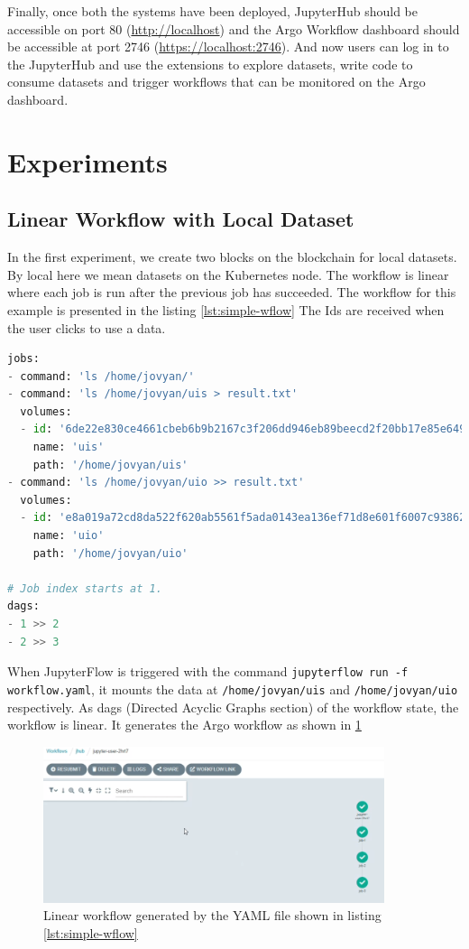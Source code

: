 \bigskip
Finally, once both the systems have been deployed, JupyterHub should be accessible on port 80 (\url{http://localhost}) and the Argo Workflow dashboard should be accessible at port 2746 (\url{https://localhost:2746}). And now users can log in to the JupyterHub and use the extensions to explore datasets, write code to consume datasets and trigger workflows that can be monitored on the Argo dashboard.

\section{Experiments}
\subsection{Linear Workflow with Local Dataset}
In the first experiment, we create two blocks on the blockchain for local datasets. By local here we mean datasets on the Kubernetes node. The workflow is linear where each job is run after the previous job has succeeded. The workflow for this example is presented in the listing \ref{lst:simple-wflow} The Ids are received when the user clicks to use a data.

\begin{lstlisting}[language=python,caption={Simple linear workflow.yaml consuming data from the Kubernetes node},label={lst:simple-wflow}]
jobs:
- command: 'ls /home/jovyan/'
- command: 'ls /home/jovyan/uis > result.txt'
  volumes:
  - id: '6de22e830ce4661cbeb6b9b2167c3f206dd946eb89beecd2f20bb17e85e64995'
    name: 'uis'
    path: '/home/jovyan/uis'
- command: 'ls /home/jovyan/uio >> result.txt'
  volumes:
  - id: 'e8a019a72cd8da522f620ab5561f5ada0143ea136ef71d8e601f6007c9386269'
    name: 'uio'
    path: '/home/jovyan/uio'

# Job index starts at 1.
dags:
- 1 >> 2
- 2 >> 3
\end{lstlisting}

When JupyterFlow is triggered with the command \lstinline{jupyterflow run -f workflow.yaml}, it mounts the data at \lstinline{/home/jovyan/uis} and \lstinline{/home/jovyan/uio} respectively. As dags (Directed Acyclic Graphs section) of the workflow state, the workflow is linear. It generates the Argo workflow as shown in \ref{fig:linear-wflow}

\begin{figure}
    \centering
    \includegraphics[width=10cm,keepaspectratio]{photos/linear-wflow.png}
    \caption{Linear workflow generated by the YAML file shown in listing \ref{lst:simple-wflow}}
    \label{fig:linear-wflow}
\end{figure}

